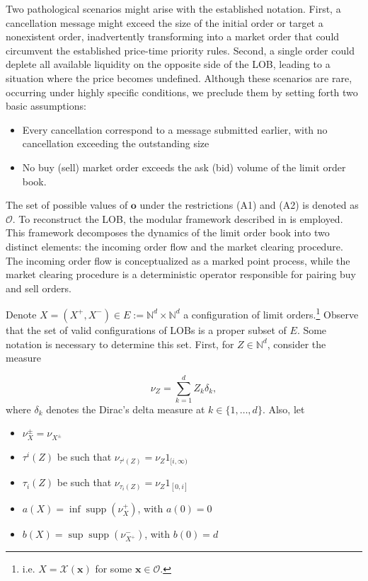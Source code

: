 \documentclass[10pt,a4paper,oneside]{article}
\newcommand{\N}{\mathbb{N}}
\DeclareMathOperator{\support}{supp}
\begin{document}
Two pathological scenarios might arise with the established notation. First, a cancellation message might exceed the size of the initial order or target a nonexistent order, inadvertently transforming into a market order that could circumvent the established price-time priority rules. Second, a single order could deplete all available liquidity on the opposite side of the LOB, leading to a situation where the price becomes undefined. Although these scenarios are rare, occurring under highly specific conditions, we preclude them by setting forth two basic assumptions:

\begin{itemize}
    \item[(A1)] Every cancellation correspond to a message submitted earlier, with no cancellation exceeding the outstanding size 
    \item[(A2)] No buy (sell) market order exceeds the ask (bid) volume of the limit order book.
\end{itemize}

The set of possible values of $\mathbf{o}$ under the restrictions (A1) and (A2) is denoted as $\mathcal{O}$. To reconstruct the LOB, the modular framework described in \cite{cont2023mathematical} is employed. This framework decomposes the dynamics of the limit order book into two distinct elements: the incoming order flow and the market clearing procedure. The incoming order flow is conceptualized as a marked point process, while the market clearing procedure is a deterministic operator responsible for pairing buy and sell orders.


Denote $X = (X^+, X^-) \in E := \N^d \times \N^d$ a configuration of limit orders.\footnote{i.e. $X = \mathcal{X}(\mathbf{x})$ for some $\mathbf{x} \in \mathcal{O}$.}  Observe that the set of valid configurations of LOBs is a proper subset of $E$. Some notation is necessary to determine this set. First, for $Z \in \N^d$, consider the measure 

$$
\nu_Z = \sum^d_{k = 1}Z_k \delta_k,
$$
where $\delta_k$ denotes the Dirac's delta measure at $k \in \{1, \dots, d \}$. Also, let

\begin{itemize}
    \item $\nu^{\pm}_X = \nu_{X^{\pm}}$
    \item $\tau^i(Z)$ be such that $\nu_{\tau^i(Z)} = \nu_Z 1_{[i, \infty)}$
    \item $\tau_i(Z)$ be such that $\nu_{\tau_i(Z)} = \nu_Z 1_{[0, i]}$
    \item $a(X) = \inf \support(\nu^+_{X})$, with $a(0) = 0$
    \item $b(X) = \sup \support(\nu^-_{X^+})$, with $b(0) = d$
\end{itemize}
\end{document}
